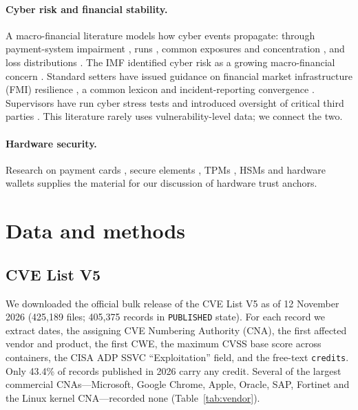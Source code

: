 \documentclass[11pt,a4paper]{article}
\begin{document}
\paragraph{Cyber risk and financial stability.} A macro-financial literature models how cyber events propagate: through payment-system impairment \citep{eisenbach2022cyber}, runs \citep{duffie2019cyber}, common exposures and concentration \citep{kashyap2019principles,healey2018future}, and loss distributions \citep{bouveret2018cyber,aldasoro2022drivers}. The IMF identified cyber risk as a growing macro-financial concern \citep{imf2024gfsr,adelmann2020cyber}. Standard setters have issued guidance on financial market infrastructure (FMI) resilience \citep{cpmi2016guidance}, a common lexicon \citep{fsb2018lexicon} and incident-reporting convergence \citep{fsb2023reporting,fsb2025fire}. Supervisors have run cyber stress tests \citep{ecb2024stress} and introduced oversight of critical third parties \citep{eu2022dora,boe2024ctp}. This literature rarely uses vulnerability-level data; we connect the two.

\paragraph{Hardware security.} Research on payment cards \citep{murdoch2010chip,basin2021emv}, secure elements \citep{nemec2017roca,roche2024eucleak}, TPMs \citep{moghimi2020tpmfail}, HSMs \citep{campana2019hsm} and hardware wallets \citep{datko2018walletfail,kraken2020trezor} supplies the material for our discussion of hardware trust anchors.

\section{Data and methods}\label{sec:data}

\subsection{CVE List V5}
We downloaded the official bulk release of the CVE List V5 \citep{cveprogram2026} as of 12 November 2026 (425,189 files; 405,375 records in \texttt{PUBLISHED} state). For each record we extract dates, the assigning CVE Numbering Authority (CNA), the first affected vendor and product, the first CWE, the maximum CVSS base score across containers, the CISA ADP SSVC ``Exploitation'' field, and the free-text \texttt{credits}. Only 43.4\% of records published in 2026 carry any credit. Several of the largest commercial CNAs---Microsoft, Google Chrome, Apple, Oracle, SAP, Fortinet and the Linux kernel CNA---recorded none (Table~\ref{tab:vendor}).
\end{document}
